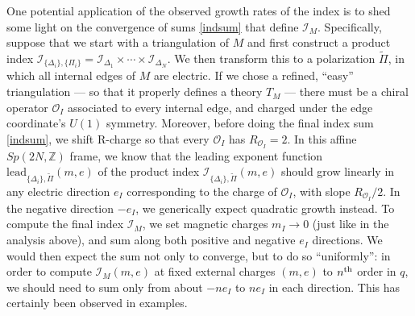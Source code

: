 \documentclass[11pt,letterpaper]{article}
\numberwithin{equation}{section}
\newcommand{\wt}{\widetilde}
\newcommand{\lead}{\mathrm{lead}}
\newcommand{\Z}{{\mathbb Z}}
\newcommand{\CI}{\mathcal{I}}
\newcommand{\CO}{\mathcal{O}}
\begin{document}
One potential application of the observed growth rates of the index is to shed some light on the convergence of sums \eqref{indsum} that define $\CI_M$. Specifically, suppose that we start with a triangulation of $M$ and first construct a product index $\CI_{\{\Delta_i\},\{\Pi_i\}}=\CI_{\Delta_1}\times\cdots\times \CI_{\Delta_N}$. We then transform this to a polarization $\wt\Pi$, in which all internal edges of $M$ are electric. If we chose a refined, ``easy'' triangulation --- so that it properly defines a theory $T_M$ --- there must be a chiral operator $\CO_I$ associated to every internal edge, and charged under the edge coordinate's $U(1)$ symmetry. Moreover, before doing the final index sum \eqref{indsum}, we shift R-charge so that every $\CO_I$ has $R_{\CO_I}=2$. In this affine $Sp(2N,\Z)$ frame, we know that the leading exponent function $\lead_{\{\Delta_i\},\tilde\Pi}(m,e)$ of the product index $\CI_{\{\Delta_i\},\tilde\Pi}(m,e)$ should grow linearly in any electric direction $e_I$ corresponding to the charge of $\CO_I$, with slope $R_{\CO_I}/2$. In the negative direction $-e_I$, we generically expect quadratic growth instead. To compute the final index $\CI_M$, we set magnetic charges $m_I \to 0$ (just like in the analysis above), and sum along both positive and negative $e_I$ directions. We would then expect the sum not only to converge, but to do so ``uniformly'': in order to compute $\CI_M(m,e)$ at fixed external charges $(m,e)$ to $n^{\rm th}$ order in $q$, we should need to sum only from about $-ne_I$ to $ne_I$ in each direction. This has certainly been observed in examples. \\
\end{document}
